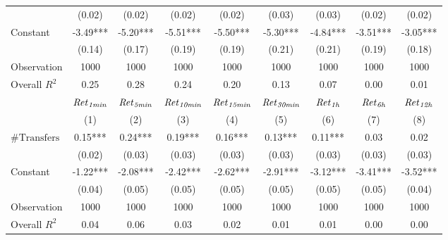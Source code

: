 \begin{tabular}{lcccccccc}
 & (0.02) & (0.02) & (0.02) & (0.02) & (0.03) & (0.03) & (0.02) & (0.02) \\
Constant & -3.49*** & -5.20*** & -5.51*** & -5.50*** & -5.30*** & -4.84*** & -3.51*** & -3.05*** \\
 & (0.14) & (0.17) & (0.19) & (0.19) & (0.21) & (0.21) & (0.19) & (0.18) \\
Observation & 1000 & 1000 & 1000 & 1000 & 1000 & 1000 & 1000 & 1000 \\
Overall $R^2$ & 0.25 & 0.28 & 0.24 & 0.20 & 0.13 & 0.07 & 0.00 & 0.01 \\
\hline
 & ${\it Ret}_{\it 1min}$ & ${\it Ret}_{\it 5min}$ & ${\it Ret}_{\it 10min}$ & ${\it Ret}_{\it 15min}$ & ${\it Ret}_{\it 30min}$ & ${\it Ret}_{\it 1h}$ & ${\it Ret}_{\it 6h}$ & ${\it Ret}_{\it 12h}$ \\
 & (1) & (2) & (3) & (4) & (5) & (6) & (7) & (8) \\
\hline
$\mathrm{\#Transfers}$ & 0.15*** & 0.24*** & 0.19*** & 0.16*** & 0.13*** & 0.11*** & 0.03 & 0.02 \\
 & (0.02) & (0.03) & (0.03) & (0.03) & (0.03) & (0.03) & (0.03) & (0.03) \\
Constant & -1.22*** & -2.08*** & -2.42*** & -2.62*** & -2.91*** & -3.12*** & -3.41*** & -3.52*** \\
 & (0.04) & (0.05) & (0.05) & (0.05) & (0.05) & (0.05) & (0.05) & (0.04) \\
Observation & 1000 & 1000 & 1000 & 1000 & 1000 & 1000 & 1000 & 1000 \\
Overall $R^2$ & 0.04 & 0.06 & 0.03 & 0.02 & 0.01 & 0.01 & 0.00 & 0.00 \\
\hline
\end{tabular}
